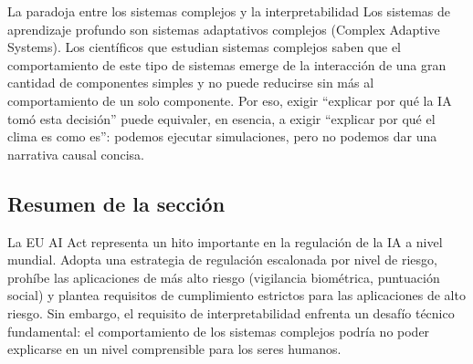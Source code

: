 \begin{importantbox}{La paradoja entre los sistemas complejos y la interpretabilidad}
Los sistemas de aprendizaje profundo son sistemas adaptativos complejos (Complex Adaptive Systems). Los científicos que estudian sistemas complejos saben que el comportamiento de este tipo de sistemas emerge de la interacción de una gran cantidad de componentes simples y no puede reducirse sin más al comportamiento de un solo componente. Por eso, exigir ``explicar por qué la IA tomó esta decisión'' puede equivaler, en esencia, a exigir ``explicar por qué el clima es como es'': podemos ejecutar simulaciones, pero no podemos dar una narrativa causal concisa.
\end{importantbox}

\subsection{Resumen de la sección}

La EU AI Act representa un hito importante en la regulación de la IA a nivel mundial. Adopta una estrategia de regulación escalonada por nivel de riesgo, prohíbe las aplicaciones de más alto riesgo (vigilancia biométrica, puntuación social) y plantea requisitos de cumplimiento estrictos para las aplicaciones de alto riesgo. Sin embargo, el requisito de interpretabilidad enfrenta un desafío técnico fundamental: el comportamiento de los sistemas complejos podría no poder explicarse en un nivel comprensible para los seres humanos.

